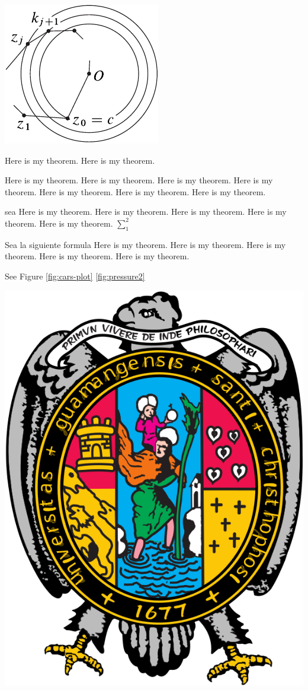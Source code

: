 \documentclass[12pt,]{report}
\let\origfigure=\figure
\let\endorigfigure=\endfigure
\renewenvironment{figure}[1][]{%
  \origfigure[H]
}{%
  \endorigfigure
}
\theoremstyle{slplain}
\let\BeginKnitrBlock\begin \let\EndKnitrBlock\end
\begin{document}
\begin{figure}

{\centering \includegraphics{inverse} 

}

\caption{ww}\label{fig:pressure2}
\end{figure}

Here is my theorem.
Here is my theorem.

\BeginKnitrBlock{theorem}
\protect\hypertarget{thm:boring}{}{\label{thm:boring} }Here is my theorem. Here is my theorem.
Here is my theorem.
Here is my theorem.
Here is my theorem.
Here is my theorem.
Here is my theorem.
\EndKnitrBlock{theorem}

sea Here is my theorem.
Here is my theorem.
Here is my theorem.
Here is my theorem.
Here is my theorem. \(\sum_1^2\)

\BeginKnitrBlock{definition}[ww]
\protect\hypertarget{def:unnamed-chunk-1}{}{\label{def:unnamed-chunk-1} {} }Sea la siguiente formula Here is my theorem.
Here is my theorem.
Here is my theorem.
Here is my theorem.
Here is my theorem.
\EndKnitrBlock{definition}

See Figure \ref{fig:cars-plot} \ref{fig:pressure2}

\begin{figure}

{\centering \includegraphics[width=0.2\linewidth]{U} 

}

\caption{ww}\label{fig:pressure1}
\end{figure}
\end{document}
